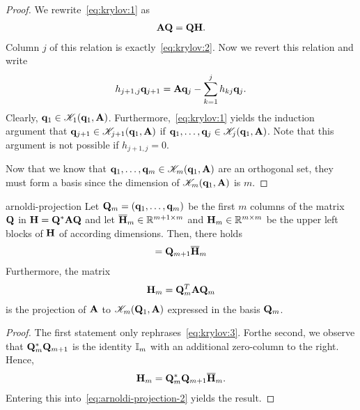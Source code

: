 \begin{proof}
  We rewrite~\eqref{eq:krylov:1} as
  \begin{gather}
    \mathbf A\mathbf Q = \mathbf Q\mathbf H.
  \end{gather}
  Column $j$ of this relation is exactly~\eqref{eq:krylov:2}. Now we
  revert this relation and write
  \begin{gather}
    \label{eq:krylov:3}
    h_{j+1,j} \mathbf q_{j+1} = \mathbf A\mathbf q_j - \sum_{k=1}^j h_{kj} \mathbf q_j.
  \end{gather}
  Clearly, $\mathbf q_1\in\mathscr K_1(\mathbf q_1,\mathbf A)$.
  Furthermore,~\eqref{eq:krylov:1} yields the induction argument that
  $\mathbf q_{j+1}\in \mathscr K_{j+1}(\mathbf q_1,\mathbf A)$ if
  $\mathbf q_1,\dots,\mathbf q_j\in \mathscr K_j(\mathbf q_1,\mathbf A)$. Note that this
  argument is not possible if $h_{j+1,j}=0$.

  Now that we know that $\mathbf q_1,\dots,\mathbf q_m\in\mathscr K_{m}(\mathbf q_1,\mathbf A)$
  are an orthogonal set, they must form a basis since the dimension of
  $\mathscr K_{m}(\mathbf q_1,\mathbf A)$ is $m$.
\end{proof}

\begin{Theorem}{arnoldi-projection}
  Let $\mathbf Q_m = (\mathbf q_1,\dots,\mathbf q_m)$ be the first $m$ columns of the
  matrix $\mathbf Q$ in $\mathbf H = \mathbf Q^*\mathbf A\mathbf Q$ and let
  $\overline{\mathbf H}_m\in\mathbb R^{m+1\times m}$ and
  $\mathbf H_m\in\mathbb R^{m\times m}$ be the upper left blocks of $\mathbf H$ of
  according dimensions. Then, there holds
  \begin{gather}
    \label{eq:arnoldi-projection-2}
    = \mathbf Q_{m+1}\overline{\mathbf H}_m
  \end{gather}
  Furthermore, the matrix
  \begin{gather}
    \label{eq:arnoldi-projection-3}
    \mathbf H_m = \mathbf Q_m^T\mathbf A\mathbf Q_m
  \end{gather}
  is the projection of $\mathbf A$ to $\mathscr K_m(\mathbf Q_1,\mathbf A)$ expressed
  in the basis $\mathbf Q_m$.
\end{Theorem}

\begin{proof}
  The first statement only rephrases~\eqref{eq:krylov:3}. Forthe
  second, we observe that $\mathbf Q_m^*\mathbf Q_{m+1}$ is the identity
  $\mathbb I_m$ with an additional zero-column to the right. Hence,
  \begin{gather}
    \mathbf H_m = \mathbf Q_m^*\mathbf Q_{m+1}\overline{\mathbf H}_{m}.
  \end{gather}
  Entering this into~\eqref{eq:arnoldi-projection-2} yields the result.
\end{proof}

